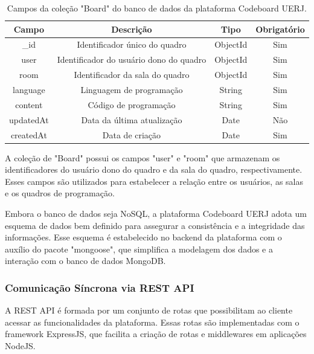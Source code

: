 \begin{table}[H]
    \centering
    \begin{tabular}{|c|c|c|c|}
        \hline
        \textbf{Campo} & \textbf{Descrição}             & \textbf{Tipo} & \textbf{Obrigatório} \\
        \hline
        \_id           & Identificador único do quadro  & ObjectId      & Sim                  \\
        user         & Identificador do usuário dono do quadro & ObjectId      & Sim                  \\
        room         & Identificador da sala do quadro & ObjectId      & Sim                  \\
        language       & Linguagem de programação       & String        & Sim                  \\
        content           & Código de programação          & String        & Sim                  \\
        updatedAt      & Data da última atualização      & Date          & Não                  \\
        createdAt      & Data de criação      & Date          & Sim                  \\
        \hline
    \end{tabular}
    \caption{Campos da coleção "Board" do banco de dados da plataforma Codeboard UERJ.}
    \label{tab:board-collection-fields}
\end{table}

A coleção de "Board" possui os campos "user" e "room" que armazenam os identificadores do usuário dono do quadro e da sala do quadro, respectivamente. Esses campos são utilizados para estabelecer a relação entre os usuários, as salas e os quadros de programação.


Embora o banco de dados seja NoSQL, a plataforma Codeboard UERJ adota um esquema de dados bem definido para assegurar a consistência e a integridade das informações. Esse esquema é estabelecido no backend da plataforma com o auxílio do pacote "mongoose", que simplifica a modelagem dos dados e a interação com o banco de dados MongoDB.

\subsubsection{Comunicação Síncrona via REST API}

A REST API é formada por um conjunto de rotas que possibilitam ao cliente acessar as funcionalidades da plataforma. Essas rotas são implementadas com o framework ExpressJS, que facilita a criação de rotas e middlewares em aplicações NodeJS.

